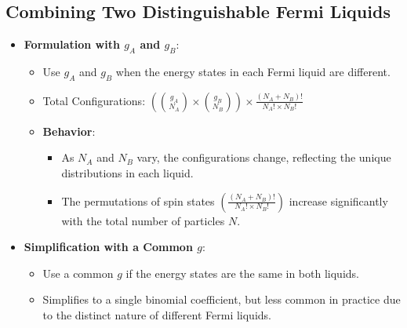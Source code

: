 \documentclass[12pt]{article}
\begin{document}
\subsection{ Combining Two Distinguishable Fermi Liquids}
\begin{itemize}
    \item \textbf{Formulation with $g_A$ and $g_B$}:
    \begin{itemize}
        \item Use $g_A$ and $g_B$ when the energy states in each Fermi liquid are different.
        \item Total Configurations: $\left( \binom{g_A}{N_A} \times \binom{g_B}{N_B} \right) \times \frac{(N_A + N_B)!}{N_A! \times N_B!}$
        \item \textbf{Behavior}:
        \begin{itemize}
            \item As $N_A$ and $N_B$ vary, the configurations change, reflecting the unique distributions in each liquid.
            \item The permutations of spin states $\left( \frac{(N_A + N_B)!}{N_A! \times N_B!} \right)$ increase significantly with the total number of particles $N$.
        \end{itemize}
    \end{itemize}
    \item \textbf{Simplification with a Common $g$}:
    \begin{itemize}
        \item Use a common $g$ if the energy states are the same in both liquids.
        \item Simplifies to a single binomial coefficient, but less common in practice due to the distinct nature of different Fermi liquids.
    \end{itemize}
\end{itemize}
\end{document}

